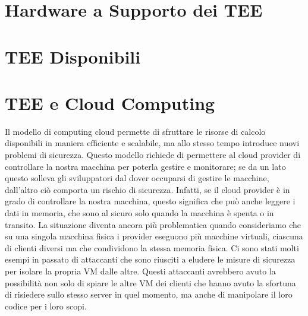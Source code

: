 \documentclass[12pt,italian]{report}
\begin{document}
\section{Hardware a Supporto dei TEE}
\label{sec:hardware-supporto-tee}

\section{TEE Disponibili}
\label{sec:tee-disponibili}

\section{TEE e Cloud Computing}
\label{sec:tee-e-cloud-computing}
Il modello di computing cloud permette di sfruttare le risorse di calcolo
disponibili in maniera efficiente e scalabile, ma allo stesso tempo introduce
nuovi problemi di sicurezza.
Questo modello richiede di permettere al cloud provider di controllare la
nostra macchina per poterla gestire e monitorare; se da un lato questo solleva
gli sviluppatori dal dover occuparsi di gestire le macchine, dall'altro ciò
comporta un rischio di sicurezza.
Infatti, se il cloud provider è in grado di controllare la nostra macchina,
questo significa che può anche leggere i dati in memoria, che sono al sicuro
solo quando la macchina è spenta o in transito.
La situazione diventa ancora più problematica quando consideriamo che su
una singola macchina fisica i provider eseguono più macchine virtuali, ciascuna
di clienti diversi ma che condividono la stessa memoria fisica.
Ci sono stati molti esempi in passato di attaccanti che sono riusciti a eludere
le misure di sicurezza per isolare la propria VM dalle altre. %
Questi attaccanti avrebbero avuto la possibilità non solo di spiare le altre
VM dei clienti che hanno avuto la sfortuna di risiedere sullo stesso server in
quel momento, ma anche di manipolare il loro codice per i loro scopi.
\end{document}
